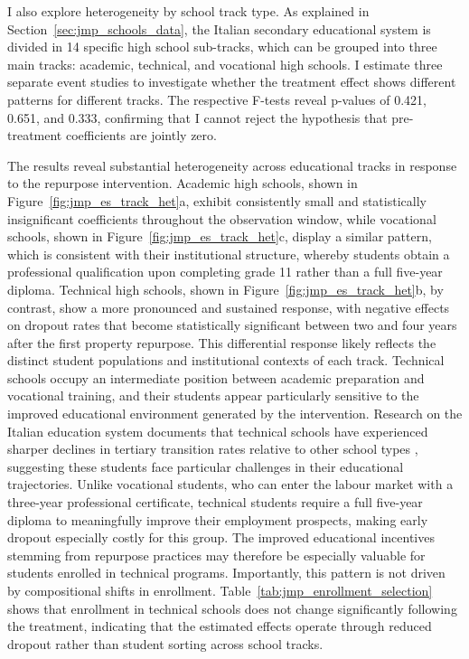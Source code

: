 \documentclass[12pt]{article}
\theoremstyle{plain}
\theoremstyle{plain}
\theoremstyle{plain}
\theoremstyle{definition}
\theoremstyle{plain}
\theoremstyle{definition}
\theoremstyle{plain}
\theoremstyle{remark}
\theoremstyle{definition}
\theoremstyle{definition}
\theoremstyle{plain}
\begin{document}
I also explore heterogeneity by school track type. As explained in Section~\ref{sec:jmp_schools_data}, the Italian secondary educational system is divided in 14 specific high school sub-tracks, which can be grouped into three main tracks: academic, technical, and vocational high schools. I estimate three separate event studies to investigate whether the treatment effect shows different patterns for different tracks. The respective F-tests reveal p-values of 0.421, 0.651, and 0.333, confirming that I cannot reject the hypothesis that pre-treatment coefficients are jointly zero. \par
\medskip
The results reveal substantial heterogeneity across educational tracks in response to the repurpose intervention. Academic high schools, shown in Figure~\ref{fig:jmp_es_track_het}a, exhibit consistently small and statistically insignificant coefficients throughout the observation window, while vocational schools, shown in Figure~\ref{fig:jmp_es_track_het}c, display a similar  pattern, which is consistent with their institutional structure, whereby students obtain a professional qualification upon completing grade 11 rather than a full five-year diploma. Technical high schools, shown in Figure~\ref{fig:jmp_es_track_het}b, by contrast, show a more pronounced and sustained response, with negative effects on dropout rates that become statistically significant between two and four years after the first property repurpose.
This differential response likely reflects the distinct student populations and institutional contexts of each track. Technical schools occupy an intermediate position between academic preparation and vocational training, and their students appear particularly sensitive to the improved educational environment generated by the intervention. Research on the Italian education system documents that technical schools have experienced sharper declines in tertiary transition rates relative to other school types \citep{contini_too_2020}, suggesting these students face particular challenges in their educational trajectories. Unlike vocational students, who can enter the labour market with a three-year professional certificate, technical students require a full five-year diploma to meaningfully improve their employment prospects, making early dropout especially costly for this group. The improved educational incentives stemming from repurpose practices may therefore be especially valuable for students enrolled in technical programs.
Importantly, this pattern is not driven by compositional shifts in enrollment. Table~\ref{tab:jmp_enrollment_selection} shows that enrollment in technical schools does not change significantly following the treatment, indicating that the estimated effects operate through reduced dropout rather than student sorting across school tracks. \par
\end{document}
